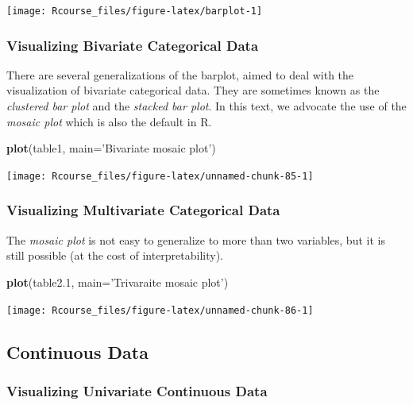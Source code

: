 \documentclass[]{book}
\newenvironment{Shaded}{\begin{snugshade}}{\end{snugshade}}
\newcommand{\KeywordTok}[1]{\textcolor[rgb]{0.13,0.29,0.53}{\textbf{#1}}}
\newcommand{\DataTypeTok}[1]{\textcolor[rgb]{0.13,0.29,0.53}{#1}}
\newcommand{\DecValTok}[1]{\textcolor[rgb]{0.00,0.00,0.81}{#1}}
\newcommand{\StringTok}[1]{\textcolor[rgb]{0.31,0.60,0.02}{#1}}
\newcommand{\NormalTok}[1]{#1}
\theoremstyle{definition}
\theoremstyle{definition}
\theoremstyle{definition}
\theoremstyle{remark}
\begin{document}
\texttt{[image: Rcourse\_files/figure-latex/barplot-1]}

\subsubsection{Visualizing Bivariate Categorical
Data}\label{visualizing-bivariate-categorical-data}

There are several generalizations of the barplot, aimed to deal with the
visualization of bivariate categorical data. They are sometimes known as
the \emph{clustered bar plot} and the \emph{stacked bar plot}. In this
text, we advocate the use of the \emph{mosaic plot} which is also the
default in R.

\begin{Shaded}
\begin{Highlighting}[]
\KeywordTok{plot}\NormalTok{(table1, }\DataTypeTok{main=}\StringTok{'Bivariate mosaic plot'}\NormalTok{)}
\end{Highlighting}
\end{Shaded}

\texttt{[image: Rcourse\_files/figure-latex/unnamed-chunk-85-1]}

\subsubsection{Visualizing Multivariate Categorical
Data}\label{visualizing-multivariate-categorical-data}

The \emph{mosaic plot} is not easy to generalize to more than two
variables, but it is still possible (at the cost of interpretability).

\begin{Shaded}
\begin{Highlighting}[]
\KeywordTok{plot}\NormalTok{(table2.}\DecValTok{1}\NormalTok{, }\DataTypeTok{main=}\StringTok{'Trivaraite mosaic plot'}\NormalTok{)}
\end{Highlighting}
\end{Shaded}

\texttt{[image: Rcourse\_files/figure-latex/unnamed-chunk-86-1]}

\subsection{Continuous Data}\label{continuous-data}

\subsubsection{Visualizing Univariate Continuous
Data}\label{visualizing-univariate-continuous-data}
\end{document}
